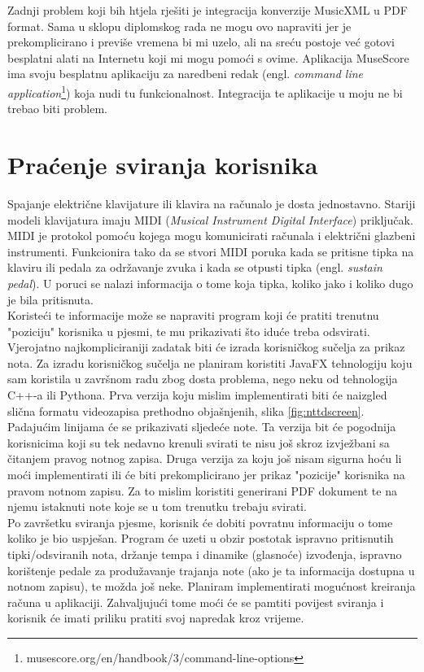 \documentclass[times, utf8, seminar, numeric]{fer}
\begin{document}
Zadnji problem koji bih htjela rješiti je integracija konverzije MusicXML u PDF format. Sama u sklopu diplomskog rada ne mogu ovo napraviti jer je prekomplicirano i previše vremena bi mi uzelo, ali na sreću postoje već gotovi besplatni alati na Internetu koji mi mogu pomoći s ovime. Aplikacija MuseScore ima svoju besplatnu aplikaciju za naredbeni redak (engl. \textit{command line application}\footnote{musescore.org/en/handbook/3/command-line-options}) koja nudi tu funkcionalnost. Integracija te aplikacije u moju ne bi trebao biti problem.

\section{Praćenje sviranja korisnika}
Spajanje električne klavijature ili klavira na računalo je dosta jednostavno. Stariji modeli klavijatura imaju MIDI\cite{midi} (\textit{Musical Instrument Digital Interface}) priključak. MIDI je protokol pomoću kojega mogu komunicirati računala i električni glazbeni instrumenti. Funkcionira tako da se stvori MIDI poruka kada se pritisne tipka na klaviru ili pedala za održavanje zvuka i kada se otpusti tipka (engl. \textit{sustain pedal}). U poruci se nalazi informacija o tome koja tipka, koliko jako i koliko dugo je bila pritisnuta.\\

Koristeći te informacije može se napraviti program koji će pratiti trenutnu "poziciju" korisnika u pjesmi, te mu prikazivati što iduće treba odsvirati. Vjerojatno najkompliciraniji zadatak biti će izrada korisničkog sučelja za prikaz nota. Za izradu korisničkog sučelja ne planiram koristiti JavaFX tehnologiju koju sam koristila u završnom radu zbog dosta problema, nego neku od tehnologija C++-a ili Pythona. Prva verzija koju mislim implementirati biti će naizgled slična formatu videozapisa prethodno objašnjenih, slika \ref{fig:nttdscreen}. Padajućim linijama će se prikazivati sljedeće note. Ta verzija bit će pogodnija korisnicima koji su tek nedavno krenuli svirati te nisu još skroz izvježbani sa čitanjem pravog notnog zapisa. Druga verzija za koju još nisam sigurna hoću li moći implementirati ili će biti prekomplicirano jer prikaz "pozicije" korisnika na pravom notnom zapisu. Za to mislim koristiti generirani PDF dokument te na njemu istaknuti note koje se u tom trenutku trebaju svirati.\\

Po završetku sviranja pjesme, korisnik će dobiti povratnu informaciju o tome koliko je bio uspješan. Program će uzeti u obzir postotak ispravno pritisnutih tipki/odsviranih nota, držanje tempa i dinamike (glasnoće) izvođenja, ispravno korištenje pedale za produžavanje trajanja note (ako je ta informacija dostupna u notnom zapisu), te možda još neke. Planiram implementirati mogućnost kreiranja računa u aplikaciji. Zahvaljujući tome moći će se pamtiti povijest sviranja i korisnik će imati priliku pratiti svoj napredak kroz vrijeme.
\end{document}
